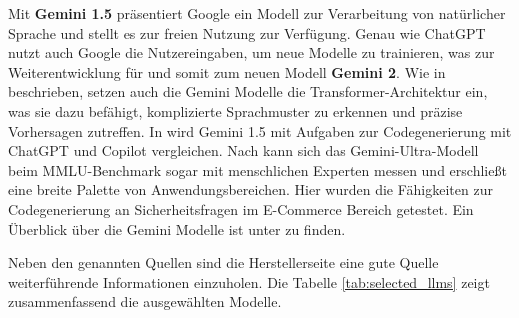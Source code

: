 Mit \textbf{Gemini 1.5} präsentiert Google ein Modell zur Verarbeitung von natürlicher Sprache und stellt es zur freien Nutzung zur Verfügung. Genau wie ChatGPT nutzt auch Google die Nutzereingaben, um neue Modelle zu trainieren, was zur Weiterentwicklung für und somit zum neuen Modell \textbf{Gemini 2}. Wie in \cite{siam-2024} beschrieben, setzen auch die Gemini Modelle die Transformer-Architektur ein, was sie dazu befähigt, komplizierte Sprachmuster zu erkennen und präzise Vorhersagen zutreffen. In \cite{siam-2024} wird Gemini 1.5 mit Aufgaben zur Codegenerierung mit ChatGPT und Copilot vergleichen. Nach \cite{elgedawy-2024} kann sich das Gemini-Ultra-Modell beim MMLU-Benchmark sogar mit menschlichen Experten messen und erschließt eine breite Palette von Anwendungsbereichen. Hier wurden die Fähigkeiten zur Codegenerierung an Sicherheitsfragen im E-Commerce Bereich getestet. Ein Überblick über die Gemini Modelle ist unter \cite{google_gemini_model_overview} zu finden.\vspace{0.2cm}

Neben den genannten Quellen sind die Herstellerseite eine gute Quelle weiterführende Informationen einzuholen. Die Tabelle \ref{tab:selected_llms} zeigt zusammenfassend die ausgewählten Modelle.\vspace{0.2cm}

